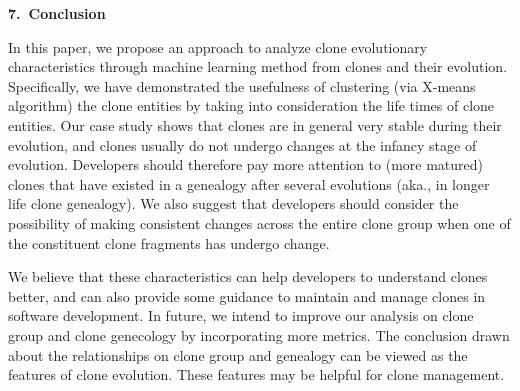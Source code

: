 \begin{center}{\large\bf 7.\ Conclusion}\end{center}

In this paper, we propose an approach to analyze clone evolutionary characteristics through machine learning method from clones and their evolution. Specifically, we have demonstrated the usefulness of clustering (via X-means algorithm) the clone entities by taking into consideration the life times of clone entities. %
Our case study shows that clones are in general very stable during their evolution, and clones usually do not undergo changes at the infancy stage of evolution. Developers should therefore pay more attention to (more matured) clones that have existed in a genealogy after several evolutions (aka., in longer life clone genealogy). We also suggest that developers should consider the possibility of making consistent changes across the entire clone group when one of the constituent clone fragments has undergo change. 

We believe that these characteristics can help developers to understand clones better, and can also provide some guidance to maintain and manage clones in software development. In future, we intend to improve our analysis on clone group and clone genecology by incorporating more metrics. The conclusion drawn about the relationships on clone group and genealogy can be viewed as the features of clone evolution. These features may be helpful for clone management.

